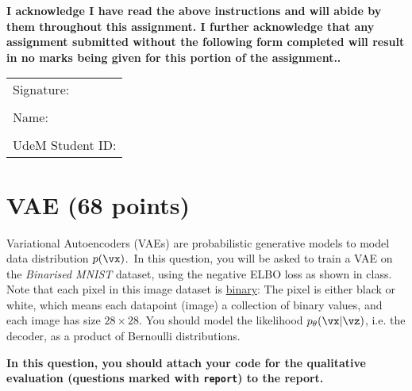 \documentclass[12pt]{article}
\theoremstyle{definition}
\begin{document}
\vspace{0.25in}
{\textbf{I acknowledge I have read the above instructions and will abide by them throughout this assignment. I further acknowledge that any assignment submitted without the following form completed will result in no marks being given for this portion of the assignment..}}
\vspace{0.5cm}\\
\begin{tabular}{p{\linewidth}}
Signature: \hrulefill \\\\
Name: \hrulefill \\\\
UdeM Student ID: \hrulefill \\
\end{tabular}

\section{VAE (68 points)}

Variational Autoencoders (VAEs) are probabilistic generative models to model data distribution $p(\vx)$.~In this question, you will be asked to train a VAE on the \emph{Binarised MNIST} dataset, using the negative ELBO loss as shown in class.
Note that each pixel in this image dataset is \underline{binary}: The pixel is either black or white, which means each datapoint (image) a collection of binary values, and each image has size $28\times28$.
You should model the likelihood $p_\theta(\vx|\vz)$, i.e. the decoder, as a product of Bernoulli distributions.

\textbf{In this question, you should attach your code for the qualitative evaluation (questions marked with \texttt{report}) to the report.}
\end{document}
